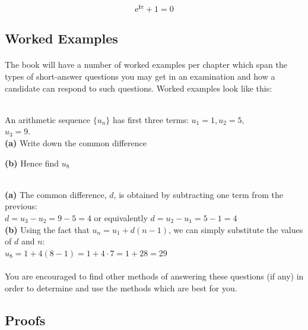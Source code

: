 \documentclass[12pt, a4paper, titlepage, twoside]{article}
\newcommand*{\im}{\mathbold{i}}
\newcommand*{\e}{\textrm{e}}
\begin{document}
	\begin{kp}
		$$\e^{\im \pi} + 1 = 0$$
	\end{kp}

	\subsection*{Worked Examples}

	\paragraph{}
	The book will have a number of worked examples per chapter which span the types of short-answer questions you may get in an 
	examination and how a candidate can respond to such questions. Worked examples look like this:\\
	
	
	\begin{ex}
		\hfill \\
		An arithmetic sequence $\{u_n\}$ has first three terms: $u_1 = 1, u_2 = 5,$ \\ $u_3 = 9$.\\
		
		\textbf{(a)} Write down the common difference
		
		\textbf{(b)} Hence find $u_8$\\
		
		\tcbline
		
		\hfill \\
		\textbf{(a)} The common difference, $d$, is obtained by subtracting one term from the previous:\\
		$d = u_3 - u_2 = 9 - 5 = 4$ or equivalently $d = u_2 - u_1 = 5 - 1 = 4$\\
		
		\textbf{(b)} Using the fact that $u_n = u_1 + d(n-1)$, we can simply substitute the values of $d$ and $n$:\\
		$u_8 = 1 + 4(8-1) = 1 + 4 \cdot 7 = 1 + 28 = 29$
		
	\end{ex}
	
	\paragraph{}
	You are encouraged to find other methods of answering these questions (if any) in order to determine and use the methods 
	which are best for you.
	
	\subsection*{Proofs}
	
\end{document}
